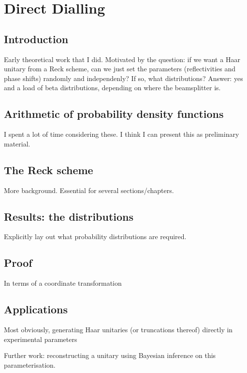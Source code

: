 \chapter{Direct Dialling}
\label{ch:DirectDialling}

\section{Introduction}
Early theoretical work that I did. Motivated by the question: if we want a Haar
unitary from a Reck scheme\cite{reck94}, can we just set the parameters
(reflectivities and phase shifts) randomly and independenly? If so, what
distributions? Answer: yes and a load of beta distributions, depending on where
the beamsplitter is.

\section{Arithmetic of probability density functions}
I spent a lot of time considering these. I think I can present this as
preliminary material.

\section{The Reck scheme}
More background. Essential for several sections/chapters.

\section{Results: the distributions}
Explicitly lay out what probability distributions are required.

\section{Proof}
In terms of a coordinate transformation

\section{Applications}
Most obviously, generating Haar unitaries (or truncations thereof) directly in
experimental parameters

Further work: reconstructing a unitary using Bayesian inference on this
parameterisation.
